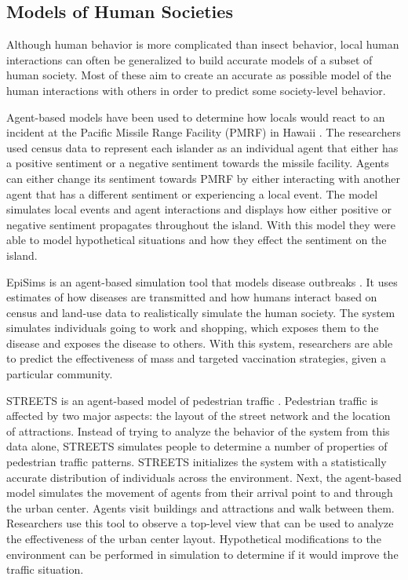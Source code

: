 \subsection{Models of Human Societies}

Although human behavior is more complicated than insect behavior, local human interactions can often be generalized to build accurate models of a subset of human society.
Most of these aim to create an accurate as possible model of the human interactions with others in order to predict some society-level behavior.

Agent-based models have been used to determine how locals would react to an incident at the Pacific Missile Range Facility (PMRF) in Hawaii \cite{zanbaka}.
The researchers used census data to represent each islander as an individual agent that either has a positive sentiment or a negative sentiment towards the missile facility.
Agents can either change its sentiment towards PMRF by either interacting with another agent that has a different sentiment or experiencing a local event.
The model simulates local events and agent interactions and displays how either positive or negative sentiment propagates throughout the island.
With this model they were able to model hypothetical situations and how they effect the sentiment on the island.

EpiSims is an agent-based simulation tool that models disease outbreaks \cite{eubank2004modelling}.
It uses estimates of how diseases are transmitted and how humans interact based on census and land-use data to realistically simulate the human society.
The system simulates individuals going to work and shopping, which exposes them to the disease and exposes the disease to others.
With this system, researchers are able to predict the effectiveness of mass and targeted vaccination strategies, given a particular community.

STREETS is an agent-based model of pedestrian traffic \cite{schelhorn1999streets}.
Pedestrian traffic is affected by two major aspects: the layout of the street network and the location of attractions.
Instead of trying to analyze the behavior of the system from this data alone, STREETS simulates people to determine a number of properties of pedestrian traffic patterns.
STREETS initializes the system with a statistically accurate distribution of individuals across the environment.
Next, the agent-based model simulates the movement of agents from their arrival point to and through the urban center.
Agents visit buildings and attractions and walk between them.
Researchers use this tool to observe a top-level view that can be used to analyze the effectiveness of the urban center layout.
Hypothetical modifications to the environment can be performed in simulation to determine if it would improve the traffic situation.




